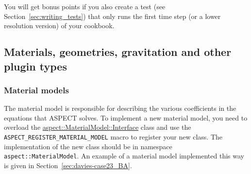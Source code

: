 \documentclass{article}
\newcommand{\aspect}{\textsc{ASPECT}}
\begin{document}
You will get bonus points if you also create a test (see Section~\ref{sec:writing_tests}) that only runs the first time step
(or a lower resolution version) of your cookbook. 

\subsection{Materials, geometries, gravitation and other plugin types}
\label{sec:plugins-concrete}

\subsubsection{Material models}
\label{sec:material-models}

The material model is responsible for describing the various coefficients in
the equations that \aspect{} solves. To implement a new material model, you
need to overload the \href{doc/doxygen/classaspect_1_1MaterialModel_1_1Interface.html}{aspect::MaterialModel::Interface} class and use
the \texttt{ASPECT\_REGISTER\_MATERIAL\_MODEL} macro to register your new
class. The implementation of the new class should be in namespace
\texttt{aspect::MaterialModel}. An example of a material model implemented
this way is given in Section~\ref{sec:davies-case23_BA}.
\end{document}
